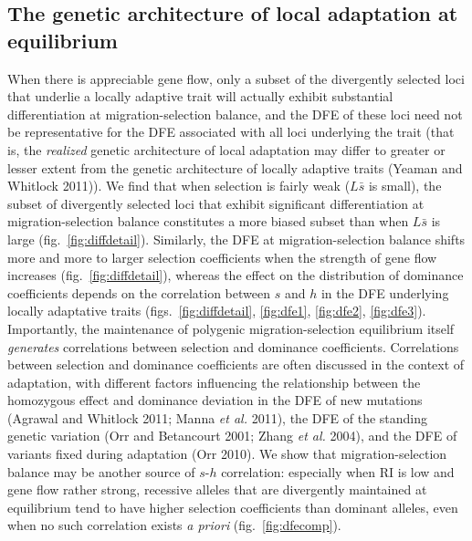 \documentclass[
  11pt,
]{article}
\begin{document}
\hypertarget{the-genetic-architecture-of-local-adaptation-at-equilibrium}{%
\subsection{The genetic architecture of local adaptation at
equilibrium}\label{the-genetic-architecture-of-local-adaptation-at-equilibrium}}

When there is appreciable gene flow, only a subset of the divergently
selected loci that underlie a locally adaptive trait will actually
exhibit substantial differentiation at migration-selection balance, and
the DFE of these loci need not be representative for the DFE associated
with all loci underlying the trait (that is, the \emph{realized} genetic
architecture of local adaptation may differ to greater or lesser extent
from the genetic architecture of locally adaptive traits (Yeaman and
Whitlock 2011)). We find that when selection is fairly weak
(\(L\bar{s}\) is small), the subset of divergently selected loci that
exhibit significant differentiation at migration-selection balance
constitutes a more biased subset than when \(L\bar{s}\) is large
(fig.~\ref{fig:diffdetail}). Similarly, the DFE at migration-selection
balance shifts more and more to larger selection coefficients when the
strength of gene flow increases (fig.~\ref{fig:diffdetail}), whereas the
effect on the distribution of dominance coefficients depends on the
correlation between \(s\) and \(h\) in the DFE underlying locally
adaptative traits
(figs.~\ref{fig:diffdetail}, \ref{fig:dfe1}, \ref{fig:dfe2}, \ref{fig:dfe3}).
Importantly, the maintenance of polygenic migration-selection
equilibrium itself \emph{generates} correlations between selection and
dominance coefficients. Correlations between selection and dominance
coefficients are often discussed in the context of adaptation, with
different factors influencing the relationship between the homozygous
effect and dominance deviation in the DFE of new mutations (Agrawal and
Whitlock 2011; Manna \emph{et al.} 2011), the DFE of the standing
genetic variation (Orr and Betancourt 2001; Zhang \emph{et al.} 2004),
and the DFE of variants fixed during adaptation (Orr 2010). We show that
migration-selection balance may be another source of \(s\)-\(h\)
correlation: especially when RI is low and gene flow rather strong,
recessive alleles that are divergently maintained at equilibrium tend to
have higher selection coefficients than dominant alleles, even when no
such correlation exists \emph{a priori} (fig.~\ref{fig:dfecomp}).
\end{document}
